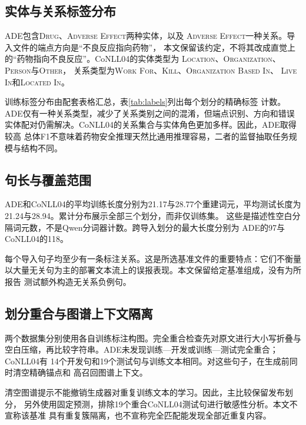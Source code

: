 \documentclass[12pt,a4paper,fontset=none]{ctexart}
\begin{document}
\subsection{实体与关系标签分布}
ADE包含\textsc{Drug}、\textsc{Adverse Effect}两种实体，以及
\textsc{Adverse Effect}一种关系。导入文件的端点方向是“不良反应指向药物”，
本文保留该约定，不将其改成直觉上的“药物指向不良反应”。CoNLL04的实体类型为
\textsc{Location}、\textsc{Organization}、\textsc{Person}与\textsc{Other}，
关系类型为\textsc{Work For}、\textsc{Kill}、\textsc{Organization Based In}、
\textsc{Live In}和\textsc{Located In}。

训练标签分布由配套表格汇总，表\ref{tab:labels}列出每个划分的精确标签
计数。ADE仅有一种关系类型，减少了关系类别之间的混淆，但端点识别、方向和错误
实体配对仍需解决。CoNLL04的关系集合与实体角色更加多样。因此，ADE取得较高
总体F1不意味着药物安全推理天然比通用推理容易，二者的监督抽取任务规模与结构不同。
\begin{table}[htbp]
\centering\small\setlength{\tabcolsep}{4pt}
\caption{导入文件的精确实体与关系计数，分别列出训练、验证和测试划分。}
\label{tab:labels}

\end{table}

\subsection{句长与覆盖范围}
ADE和CoNLL04的平均训练长度分别为21.17与28.77个重建词元，平均测试长度为
21.24与28.94。累计分布展示全部三个划分，而非仅训练集。
这些是描述性空白分隔词元数，不是Qwen分词器计数。跨导入划分的最大长度分别为
ADE的97与CoNLL04的118。

每个导入句子均至少有一条标注关系。这是所选基准文件的重要特点：它们不衡量
以大量无关句为主的部署文本流上的误报表现。本文保留给定基准组成，没有为所报告
测试额外构造无关系负例句。
\subsection{划分重合与图谱上下文隔离}
两个数据集分别使用各自训练标注构图。完全重合检查先对原文进行大小写折叠与
空白压缩，再比较字符串。ADE未发现训练—开发或训练—测试完全重合；CoNLL04有
14个开发句和19个测试句与训练文本相同。对这些句子，在生成前同时清空精确锚点和
高召回图谱上下文。

清空图谱提示不能撤销生成器对重复训练文本的学习。因此，主比较保留发布划分，
另外使用固定预测，排除19个重合CoNLL04测试句进行敏感性分析。本文不宣称该基准
具有重复簇隔离，也不宣称完全匹配能发现全部近重复内容。
\end{document}

